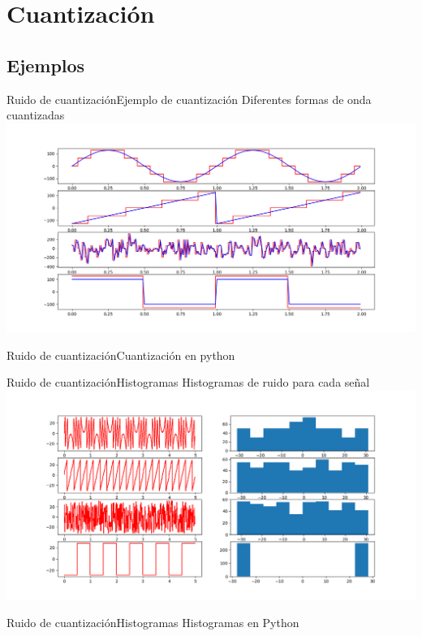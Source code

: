  \section{Cuantización}
 \subsection{Ejemplos}
 \begin{frame}{Ruido de cuantización}{Ejemplo de cuantización}
    Diferentes formas de onda cuantizadas
    \center\includegraphics[width=1\textwidth]{1_clase/noise_examples}
    \vfill
 \end{frame}
 \begin{frame}{Ruido de cuantización}{Cuantización en python}
    \handsonicon
    
    \vfill
 \end{frame}
 \begin{frame}{Ruido de cuantización}{Histogramas}
    Histogramas de ruido para cada señal
    \center\includegraphics[width=1\textwidth]{1_clase/noise_histogram}
    \vfill
 \end{frame}
 \begin{frame}{Ruido de cuantización}{Histogramas}
    Histogramas en Python
    \handsonicon
    
    \vfill
 \end{frame}

